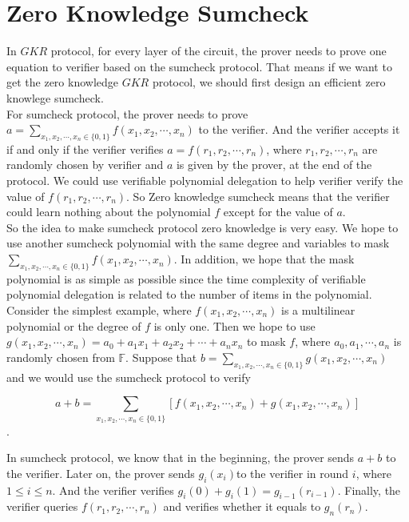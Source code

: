 

\section{Zero Knowledge Sumcheck}

In $GKR$ protocol, for every layer of the circuit, the prover needs to prove one equation to verifier based on the sumcheck protocol. That means if we want to get the zero knowledge $GKR$ protocol, we should first design an efficient zero knowlege sumcheck.\\

\noindent
For sumcheck protocol, the prover needs to prove $a = \sum\limits_{x_1, x_2, \cdots, x_n \in \{0, 1\}}f(x_1, x_2, \cdots, x_n)$ to the verifier. And the verifier accepts it if and only if the verifier verifies $a = f(r_1, r_2, \cdots, r_n)$, where $r_1, r_2, \cdots, r_n$ are randomly chosen by verifier and $a$ is given by the prover, at the end of the protocol. We could use verifiable polynomial delegation to help verifier verify the value of $f(r_1, r_2, \cdots, r_n)$. So Zero knowledge sumcheck means that the verifier could learn nothing about the polynomial $f$ except for the value of $a$.\\

\noindent
So the idea to make sumcheck protocol zero knowledge is very easy. We hope to use another sumcheck polynomial with the same degree and variables to mask $\sum\limits_{x_1, x_2, \cdots, x_n \in \{0, 1\}}f(x_1, x_2, \cdots, x_n)$. In addition, we hope that the mask polynomial is as simple as possible since the time complexity of verifiable polynomial delegation is related to the number of items in the polynomial.\\

\noindent
Consider the simplest example, where $f(x_1, x_2, \cdots, x_n)$ is a multilinear polynomial or the degree of $f$ is only one. Then we hope to use $g(x_1, x_2, \cdots, x_n) = a_0 + a_1x_1 + a_2x_2 + \cdots + a_nx_n$ to mask $f$, where $a_0, a_1, \cdots, a_n$ is randomly chosen from $\mathbb{F}$. Suppose that $b = \sum\limits_{x_1, x_2, \cdots, x_n \in \{0, 1\}}g(x_1, x_2, \cdots, x_n)$ and we would use the sumcheck protocol to verify

$$a + b = \sum\limits_{x_1, x_2, \cdots, x_n \in \{0, 1\}}[f(x_1, x_2, \cdots, x_n) + g(x_1, x_2, \cdots, x_n)]$$. 

In sumcheck protocol, we know that in the beginning, the prover sends $a + b$ to the verifier. Later on, the prover sends $g_i(x_i)$to the verifier in round $i$, where $1 \leq i \leq n$. And the verifier verifies $g_i(0) + g_i(1) = g_{i-1}(r_{i-1})$. Finally, the verifier queries $f(r_1, r_2, \cdots, r_n)$ and verifies whether it equals to $g_n(r_n)$.\\

